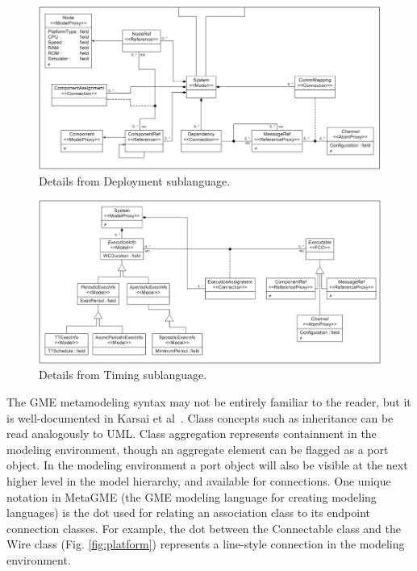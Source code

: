 \begin{figure}
	\centering
	\includegraphics[width=0.85\columnwidth]{figures/depnew.png}
	\caption{Details from Deployment sublanguage.}
	\label{fig:depnew}
\end{figure}

\begin{figure}
	\centering
	\includegraphics[width=0.85\columnwidth]{figures/timing.png}
	\caption{Details from Timing sublanguage.}
	\label{fig:timing_lang}
\end{figure}

 The GME metamodeling syntax may not be entirely familiar to the reader, 
but it is well-documented in Karsai et al~\cite{mic:gme}. Class concepts such as inheritance can be 
read analogously to UML.  Class aggregation represents containment in the modeling environment, though 
an aggregate element can be flagged as a port object.  In the modeling environment a port object will 
also be visible at the next higher level in the model hierarchy, and available for connections.  
One unique notation in MetaGME (the GME modeling language for creating modeling languages) is the dot
used for relating an association class to its endpoint connection classes.  For example, the dot 
between the Connectable class and the Wire class (Fig. \ref{fig:platform}) represents a line-style 
connection in the modeling environment.

